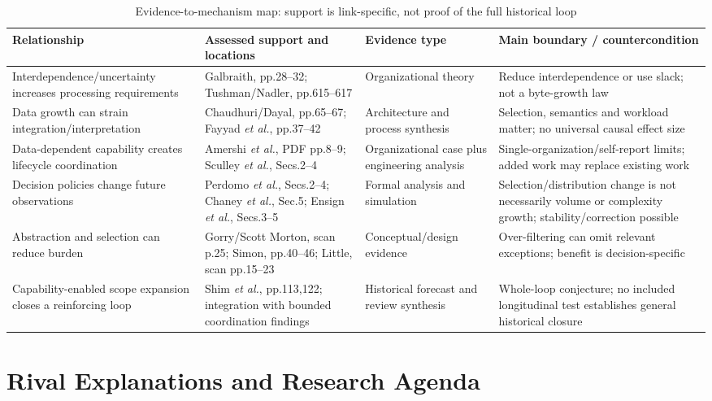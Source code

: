 \documentclass[journal]{IEEEtran}
\begin{document}
\begin{table}[t]
\caption{Evidence-to-mechanism map: support is link-specific, not proof of the full historical loop}
\label{tab:claims}
\centering\footnotesize\setlength{\tabcolsep}{4pt}
\begin{tabular}{p{}p{}p{}p{}}
\toprule
Relationship & Assessed support and locations & Evidence type & Main boundary / countercondition \\
\midrule
Interdependence/uncertainty increases processing requirements & Galbraith, pp.28--32; Tushman/Nadler, pp.615--617 \cite{GALBRAITH1974,TUSHMAN1978} & Organizational theory & Reduce interdependence or use slack; not a byte-growth law \\
Data growth can strain integration/interpretation & Chaudhuri/Dayal, pp.65--67; Fayyad \emph{et al.}, pp.37--42 \cite{chaudhuri1997,fayyad1996} & Architecture and process synthesis & Selection, semantics and workload matter; no universal causal effect size \\
Data-dependent capability creates lifecycle coordination & Amershi \emph{et al.}, PDF pp.8--9; Sculley \emph{et al.}, Secs.2--4 \cite{amershi2019,sculley2015} & Organizational case plus engineering analysis & Single-organization/self-report limits; added work may replace existing work \\
Decision policies change future observations & Perdomo \emph{et al.}, Secs.2--4; Chaney \emph{et al.}, Sec.5; Ensign \emph{et al.}, Secs.3--5 \cite{perdomo2020,chaney2018,ensign2018} & Formal analysis and simulation & Selection/distribution change is not necessarily volume or complexity growth; stability/correction possible \\
Abstraction and selection can reduce burden & Gorry/Scott Morton, scan p.25; Simon, pp.40--46; Little, scan pp.15--23 \cite{gorry1971,SIMON1971,little1969} & Conceptual/design evidence & Over-filtering can omit relevant exceptions; benefit is decision-specific \\
Capability-enabled scope expansion closes a reinforcing loop & Shim \emph{et al.}, pp.113,122; integration with bounded coordination findings \cite{shim2002,amershi2019} & Historical forecast and review synthesis & Whole-loop conjecture; no included longitudinal test establishes general historical closure \\
\bottomrule
\end{tabular}
\end{table}

\section{Rival Explanations and Research Agenda}
\end{document}
